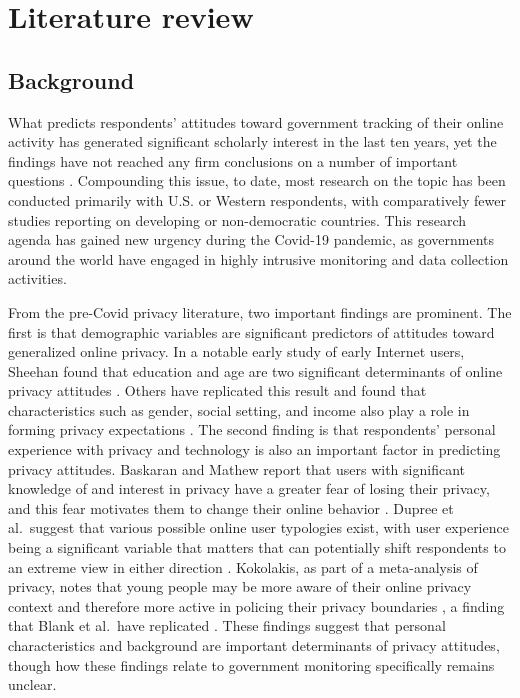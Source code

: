 \documentclass[
  number]{elsarticle}
\begin{document}
\section{Literature review}\label{sec-litreview}

\subsection{Background}\label{background}

What predicts respondents' attitudes toward government tracking of their
online activity has generated significant scholarly interest in the last
ten years, yet the findings have not reached any firm conclusions on a
number of important questions \citep{reddick2015}. Compounding this
issue, to date, most research on the topic has been conducted primarily
with U.S. or Western respondents, with comparatively fewer studies
reporting on developing or non-democratic countries. This research
agenda has gained new urgency during the Covid-19 pandemic, as
governments around the world have engaged in highly intrusive monitoring
and data collection activities.

From the pre-Covid privacy literature, two important findings are
prominent. The first is that demographic variables are significant
predictors of attitudes toward generalized online privacy. In a notable
early study of early Internet users, Sheehan found that education and
age are two significant determinants of online privacy attitudes
\citep{sheehan2002}. Others have replicated this result and found that
characteristics such as gender, social setting, and income also play a
role in forming privacy expectations
\citep{anwar2017, büchi2021, lee2019}. The second finding is that
respondents' personal experience with privacy and technology is also an
important factor in predicting privacy attitudes. Baskaran and Mathew
report that users with significant knowledge of and interest in privacy
have a greater fear of losing their privacy, and this fear motivates
them to change their online behavior \citep{baskaran2024}. Dupree et
al.~suggest that various possible online user typologies exist, with
user experience being a significant variable that matters that can
potentially shift respondents to an extreme view in either direction
\citep{dupree2016}. Kokolakis, as part of a meta-analysis of privacy,
notes that young people may be more aware of their online privacy
context and therefore more active in policing their privacy boundaries
\citep{kokolakis2017}, a finding that Blank et al.~have replicated
\citep{blank}. These findings suggest that personal characteristics and
background are important determinants of privacy attitudes, though how
these findings relate to government monitoring specifically remains
unclear.
\end{document}
